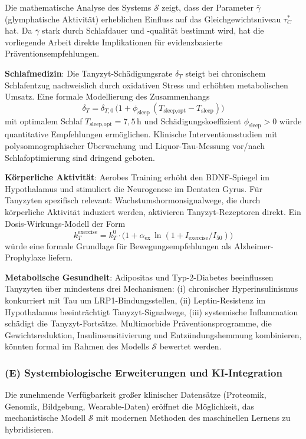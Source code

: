 ﻿\documentclass[12pt,a4paper]{article}
\theoremstyle{definition}
\begin{document}
	Die mathematische Analyse des Systems $\mathcal{S}$ zeigt, dass der Parameter $\bar{\gamma}$ (glymphatische Aktivität) erheblichen Einfluss auf das Gleichgewichtsniveau $\tau_C^*$ hat. Da $\bar{\gamma}$ stark durch Schlafdauer und -qualität bestimmt wird, hat die vorliegende Arbeit direkte Implikationen für evidenzbasierte Präventionsempfehlungen.

	\textbf{Schlafmedizin}: Die Tanyzyt-Schädigungsrate $\delta_T$ steigt bei chronischem Schlafentzug nachweislich durch oxidativen Stress und erhöhten metabolischen Umsatz. Eine formale Modellierung des Zusammenhangs
	\[
	\delta_T = \delta_{T,0}\,\bigl(1 + \phi_{\text{sleep}}\,(T_{\text{sleep,opt}} - T_{\text{sleep}})\bigr)
	\]
	mit optimalem Schlaf $T_{\text{sleep,opt}} = 7{,}5\,\text{h}$ und Schädigungskoeffizient $\phi_{\text{sleep}} > 0$ würde quantitative Empfehlungen ermöglichen. Klinische Interventionsstudien mit polysomnographischer Überwachung und Liquor-Tau-Messung vor/nach Schlafoptimierung sind dringend geboten.

	\textbf{Körperliche Aktivität}: Aerobes Training erhöht den BDNF-Spiegel im Hypothalamus und stimuliert die Neurogenese im Dentaten Gyrus. Für Tanyzyten spezifisch relevant: Wachstumshormonsignalwege, die durch körperliche Aktivität induziert werden, aktivieren Tanyzyt-Rezeptoren direkt. Ein Dosis-Wirkungs-Modell der Form
	\[
	k_T^{\text{exercise}} = k_T^0 \cdot \bigl(1 + \alpha_{\text{ex}}\, \ln(1 + I_{\text{exercise}}/I_{50})\bigr)
	\]
	würde eine formale Grundlage für Bewegungsempfehlungen als Alzheimer-Prophylaxe liefern.

	\textbf{Metabolische Gesundheit}: Adipositas und Typ-2-Diabetes beeinflussen Tanyzyten über mindestens drei Mechanismen: (i) chronischer Hyperinsulinismus konkurriert mit Tau um LRP1-Bindungsstellen, (ii) Leptin-Resistenz im Hypothalamus beeinträchtigt Tanyzyt-Signalwege, (iii) systemische Inflammation schädigt die Tanyzyt-Fortsätze. Multimorbide Präventionsprogramme, die Gewichtsreduktion, Insulinsensitivierung und Entzündungshemmung kombinieren, könnten formal im Rahmen des Modells $\mathcal{S}$ bewertet werden.

	\subsubsection*{(E) Systembiologische Erweiterungen und KI-Integration}

	Die zunehmende Verfügbarkeit großer klinischer Datensätze (Proteomik, Genomik, Bildgebung, Wearable-Daten) eröffnet die Möglichkeit, das mechanistische Modell $\mathcal{S}$ mit modernen Methoden des maschinellen Lernens zu hybridisieren.
\end{document}
